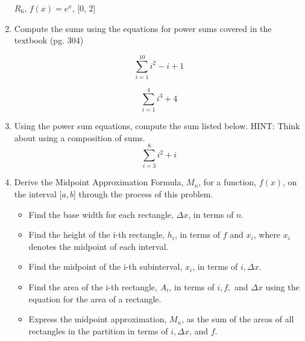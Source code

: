 \documentclass[11pt]{article}
\newcommand{\bmp}[1]{\begin{minipage}{#1\textwidth}}
\newcommand{\emp}{\end{minipage}}
\begin{document}
\begin{enumerate}
\begin{center}
    $R_6$, $f(x) = e^x$, [0, 2]
\end{center}

\item 
Compute the sums using the equations for power sums covered in the textbook (pg. 304)

\bmp{.45}
    \[
        \sum_{i=1}^{10} i^2 - i + 1
    \]
\emp
\bmp{.45}
    \[
        \sum_{i=1}^{4} i^3 + 4
    \]
\emp
\item 
Using the power sum equations, compute the sum listed below. HINT: Think about using a composition of sums.
\[
    \sum_{i=3}^{8} i^2 + i
\]

\item 
Derive the Midpoint Approximation Formula, $M_n$, for a function, $f(x)$, on the interval [$a, b$] through the process of this problem. 
\begin{itemize}
    \item Find the base width for each rectangle, $\Delta x$, in terms of $n$.

    \item Find the height of the i-th rectangle, $h_i$, in terms of $f$ and $x_i$, where $x_i$ denotes the midpoint of each interval.

    \item Find the midpoint of the i-th subinterval, $x_i$, in terms of $i, \Delta x$. 

    \item Find the area of the i-th rectangle, $A_i$, in terms of $i, f,$ and $\Delta x$ using the equation for the area of a rectangle.

    \item Express the midpoint approximation, $M_n$, as the sum of the areas of all rectangles in the partition in terms of $i, \Delta x$, and $f$.
\end{itemize}



\end{enumerate}
%

%
\end{document}
